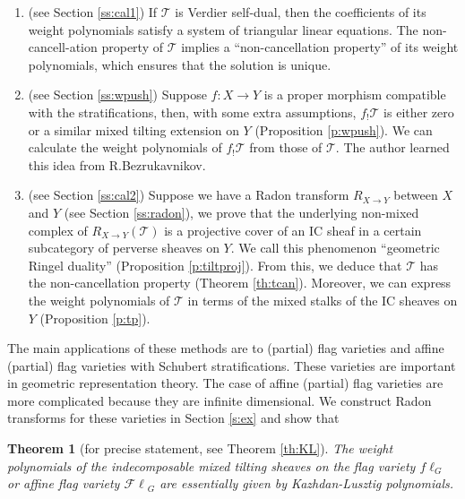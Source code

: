 \documentclass{amsart}
\theoremstyle{plain}
\newtheorem{theorem}[subsubsection]{Theorem}
\theoremstyle{definition}
\theoremstyle{remark}
\numberwithin{equation}{subsection}
\begin{document}
\begin{enumerate}[(1)]
\item (see Section \ref{ss:cal1}) If ${\mathcal{T}}$ is Verdier self-dual, then the coefficients of its weight polynomials satisfy a system of triangular linear equations. The non-cancell-\newline ation property of ${\mathcal{T}}$ implies a ``non-cancellation property'' of its weight polynomials, which ensures that the solution is unique.

\item (see Section \ref{ss:wpush}) Suppose $f:X\to Y$ is a proper morphism compatible with the stratifications, then, with some extra assumptions, $f_!{\mathcal{T}}$ is either zero or a similar mixed tilting extension on $Y$ (Proposition \ref{p:wpush}). We can calculate the weight polynomials of $f_!{\mathcal{T}}$ from those of ${\mathcal{T}}$. The author learned this idea from R.Bezrukavnikov.

\item (see Section \ref{ss:cal2}) Suppose we have a Radon transform $R_{X\to Y}$ between $X$ and $Y$ (see Section \ref{ss:radon}), we prove that the underlying non-mixed complex of $R_{X\to Y}({\mathcal{T}})$ is a projective cover of an IC sheaf in a certain subcategory of perverse sheaves on $Y$. We call this phenomenon ``geometric Ringel duality'' (Proposition \ref{p:tiltproj}). From this, we deduce that ${\mathcal{T}}$ has the non-cancellation property (Theorem \ref{th:tcan}). Moreover, we can express the weight polynomials of ${\mathcal{T}}$ in terms of the mixed stalks of the IC sheaves on $Y$ (Proposition \ref{p:tp}).
\end{enumerate}

The main applications of these methods are to (partial) flag varieties and affine (partial) flag varieties with Schubert stratifications. These varieties are important in geometric representation theory. The case of affine (partial) flag varieties are more complicated because they are infinite dimensional. We construct Radon transforms for these varieties in Section \ref{s:ex} and show that

\begin{theorem}[for precise statement, see Theorem \ref{th:KL}]\label{th:m}
The weight polynomials of the indecomposable mixed tilting sheaves on the flag variety $f\ell_G$ or affine flag variety ${\mathcal{F}\ell}_G$ are essentially given by Kazhdan-Lusztig polynomials.
\end{theorem}
\end{document}
